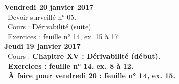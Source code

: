 \documentclass[12pt,a4paper]{article}
\begin{document}
%  
%  
%  
%  
%  

\noindent\textbf{Vendredi 20 janvier 2017}\\
\bu\ Devoir surveillé n° 05.\\
\bu\ Cours : Dérivabilité (suite).\\
\bu\ Exercices : feuille n° 14, ex. 15 à 17.\vspace{.4cm}\\

\noindent\textbf{Jeudi 19 janvier 2017}\\
\bu\ Cours : \bf Chapitre XV \rm : Dérivabilité (début).\\
\bu\ Exercices : feuille n° 14, ex. 8 à 12.\\
\bu\ À faire pour vendredi 20 : feuille n° 14, ex. 15.\vspace{.4cm}\\ 
\end{document}
